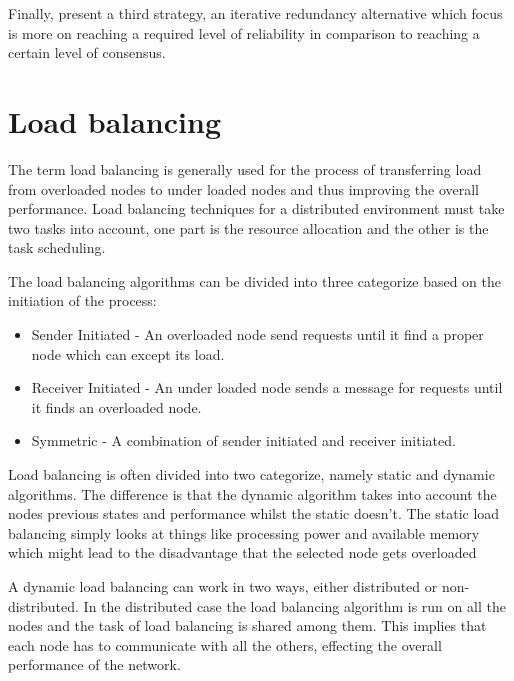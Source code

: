 \documentclass{cslthse-msc}
\begin{document}
Finally, \cite{selfAdaptRel} present a third strategy, an iterative redundancy alternative which focus is more on reaching a required level of reliability in comparison to reaching a certain level of consensus.


\iffalse
\section{Load balancing} \label{sec:background_load_balancing}
The term load balancing is generally used for the process of transferring load from overloaded nodes to under loaded nodes and thus improving the overall performance. Load balancing techniques for a distributed environment must take two tasks into account, one part is the resource allocation and the other is the task scheduling. 

The load balancing algorithms can be divided into three categorize based on the initiation of the process:
\begin{itemize}
\item Sender Initiated - An overloaded node send requests until it find a proper node which can except its load.
\item Receiver Initiated - An under loaded node sends a message for requests until it finds an overloaded node.
\item Symmetric - A combination of sender initiated and receiver initiated. 
\end{itemize}

Load balancing is often divided into two categorize, namely static and dynamic algorithms. The difference is that the dynamic algorithm takes into account the nodes previous states and performance whilst the static doesn't. The static load balancing simply looks at things like processing power and available memory which might lead to the disadvantage that the selected node gets overloaded~\cite{perfAnalysisLoadCloud}

A dynamic load balancing can work in two ways, either distributed or non-distributed. In the distributed case the load balancing algorithm is run on all the nodes and the task of load balancing is shared among them. This implies that each node has to communicate with all the others, effecting the overall performance of the network. %
\end{document}
